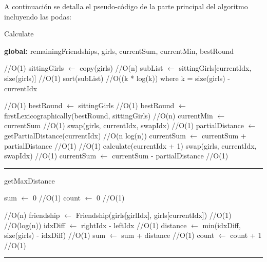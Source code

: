 A continuaci\'on se detalla el pseudo-c\'odigo de la parte principal del algoritmo incluyendo las podas:

\begin{algorithm}[H]
\caption{Calculate}
\textbf{global:} remainingFriendships, girls, currentSum, currentMin, bestRound
\begin{algorithmic}[1]
 \hfill //O(1)
\state sittingGirls $\gets$ copy(girls) \hfill //O(n)
\state subList $\gets$ sittingGirls[currentIdx, size(girls)] \hfill //O(1)
\state sort(subList) \hfill //O((k * log(k)) where k = size(girls) - currentIdx
\state 

 \hfill //O(1)
\state bestRound $\gets$ sittingGirls \hfill //O(1)
\Else
\state bestRound $\gets$ firstLexicographically(bestRound, sittingGirls) \hfill //O(n)
\endif
\state currentMin $\gets$ currentSum \hfill //O(1)
\Else
{}
\state swap(girls, currentIdx, swapIdx) \hfill //O(1)
\state partialDistance $\gets$ getPartialDistance(currentIdx) \hfill //O(n log(n))
\state currentSum $\gets$ currentSum + partialDistance \hfill //O(1)
 \hfill //O(1)
\state calculate(currentIdx + 1) 
\endif
\state swap(girls, currentIdx, swapIdx) \hfill //O(1)
\state currentSum $\gets$ currentSum - partialDistance \hfill //O(1)
\EndFor

\endif


\EndFunction 
\end{algorithmic}
\hrule
{}
\end{algorithm}

\begin{algorithm}[H]
\caption{getMaxDistance}
\begin{algorithmic}[1]

\state sum $\gets$  0 \hfill //O(1)
\state count $\gets$  0 \hfill //O(1)

 \hfill //O(n)
	\state friendship $\gets$ Friendship(girls[girlIdx], girls[currentIdx]) \hfill //O(1)
	 \hfill //O(log(n))
		\state idxDiff $\gets$ rightIdx - leftIdx \hfill //O(1)
		\state distance $\gets$ min(idxDiff, size(girls) - idxDiff) \hfill //O(1)
		\state sum $\gets$ sum + distance \hfill //O(1)
		\state count $\gets$ count + 1 \hfill //O(1)
	
	\endif

\EndFor

\EndFunction 
\end{algorithmic}
\hrule
{}
\end{algorithm}

